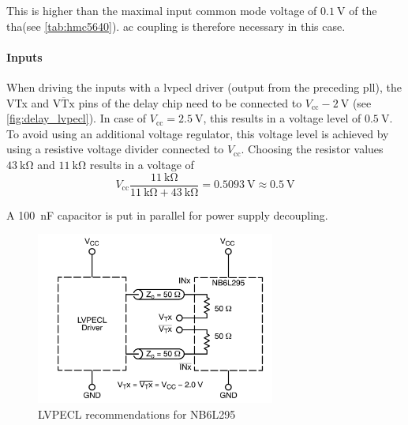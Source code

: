 This is higher than the maximal input common mode voltage of $\SI{0.1}{\volt}$ of the \gls{tha}(see \autoref{tab:hmc5640}).
\gls{ac} coupling is therefore necessary in this case.


\paragraph{Inputs}
When driving the inputs with a \gls{lvpecl} driver (output from the preceding \gls{pll}), the VTx and $\overline{\text{VTx}}$ pins of the delay chip need to be connected to $V_\text{cc} - \SI{2}{\volt}$ (see \autoref{fig:delay_lvpecl}).
In case of $V_\text{cc} = \SI{2.5}{\volt}$, this results in a voltage level of $\SI{0.5}{\volt}$.
To avoid using an additional voltage regulator, this voltage level is achieved by using a resistive voltage divider connected to $V_\text{cc}$.
Choosing the resistor values $\SI{43}{\kilo\ohm}$ and $\SI{11}{\kilo\ohm}$ results in a voltage of
\begin{equation}
	V_\text{cc} \frac{\SI{11}{\kilo\ohm}}{\SI{11}{\kilo\ohm} + \SI{43}{\kilo\ohm}} = \SI{0.5093}{\volt} \approx \SI{0.5}{\volt}
\end{equation}

A \SI{100}{\nano\farad} capacitor is put in parallel for power supply decoupling.

\begin{figure}[tbh]
	\centering
	\includegraphics[width = 0.7\textwidth]{chap/04-work/img/delay_lvpecl}
	\caption[NB6L295 Delay Chip Schematic]{LVPECL recommendations for NB6L295 \cite{NB6L295}}
	\label{fig:delay_lvpecl}
\end{figure}


